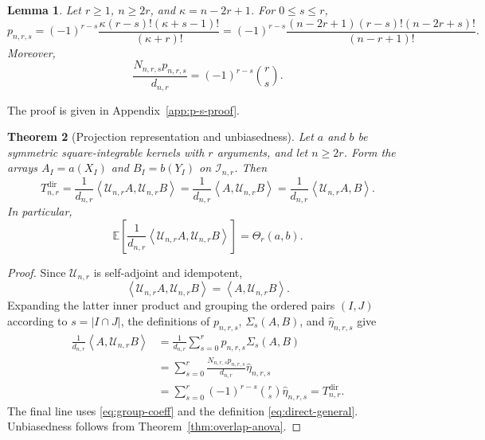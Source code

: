 \documentclass[11pt]{article}
\theoremstyle{plain}
\newtheorem{theorem}{Theorem}[section]
\newtheorem{lemma}[theorem]{Lemma}
\theoremstyle{definition}
\theoremstyle{remark}
\newcommand{\E}{\mathbb E}
\newcommand{\cI}{\mathcal I}
\newcommand{\cU}{\mathcal U}
\newcommand{\inner}[2]{\left\langle #1,#2\right\rangle}
\begin{document}
\begin{lemma}
\label{lem:p-s}
Let $r\ge1$, $n\ge2r$, and $\kappa=n-2r+1$.  For $0\le s\le r$,
\begin{equation}\label{eq:p-s-closed}
 p_{n,r,s}
 =(-1)^{r-s}
 \frac{\kappa(r-s)!(\kappa+s-1)!}{(\kappa+r)!}
 =(-1)^{r-s}
 \frac{(n-2r+1)(r-s)!(n-2r+s)!}{(n-r+1)!}.
\end{equation}
Moreover,
\begin{equation}\label{eq:group-coeff}
 \frac{N_{n,r,s}p_{n,r,s}}{d_{n,r}}
 =(-1)^{r-s}\binom rs.
\end{equation}
\end{lemma}

The proof is given in Appendix~\ref{app:p-s-proof}.

\begin{samepage}
\begin{theorem}[Projection representation and unbiasedness]
\label{thm:general-compression}
Let $a$ and $b$ be symmetric square-integrable kernels with $r$ arguments,
and let $n\ge2r$.  Form the arrays $A_I=a(X_I)$ and $B_I=b(Y_I)$ on
$\cI_{n,r}$.  Then
\begin{equation}\label{eq:general-compression}
 \boxed{
 T_{n,r}^{\mathrm{dir}}
 =\frac{1}{d_{n,r}}
   \inner{\cU_{n,r}A}{\cU_{n,r}B}
 =\frac{1}{d_{n,r}}\inner{A}{\cU_{n,r}B}
 =\frac{1}{d_{n,r}}\inner{\cU_{n,r}A}{B}.
 }
\end{equation}
In particular,
\begin{equation*}
 \E\left[
 \frac{1}{d_{n,r}}
 \inner{\cU_{n,r}A}{\cU_{n,r}B}
\right]
 =\Theta_r(a,b).
\end{equation*}
\end{theorem}
\end{samepage}


\begin{proof}
Since $\cU_{n,r}$ is self-adjoint and idempotent,
\[
 \inner{\cU_{n,r}A}{\cU_{n,r}B}
 =\inner{A}{\cU_{n,r}B}.
\]
Expanding the latter inner product and grouping the ordered pairs $(I,J)$
according to $s=|I\cap J|$, the definitions of $p_{n,r,s}$,
$\Sigma_s(A,B)$, and $\widehat\eta_{n,r,s}$ give
\begin{align*}
 \frac{1}{d_{n,r}}\inner{A}{\cU_{n,r}B}
 &=\frac{1}{d_{n,r}}\sum_{s=0}^r
   p_{n,r,s}\Sigma_s(A,B)\\
 &=\sum_{s=0}^r
   \frac{N_{n,r,s}p_{n,r,s}}{d_{n,r}}
   \widehat\eta_{n,r,s}\\
 &=\sum_{s=0}^r(-1)^{r-s}\binom rs
   \widehat\eta_{n,r,s}
 =T_{n,r}^{\mathrm{dir}}.
\end{align*}
The final line uses \eqref{eq:group-coeff} and the definition
\eqref{eq:direct-general}.
Unbiasedness follows from Theorem~\ref{thm:overlap-anova}.
\end{proof}
\end{document}

